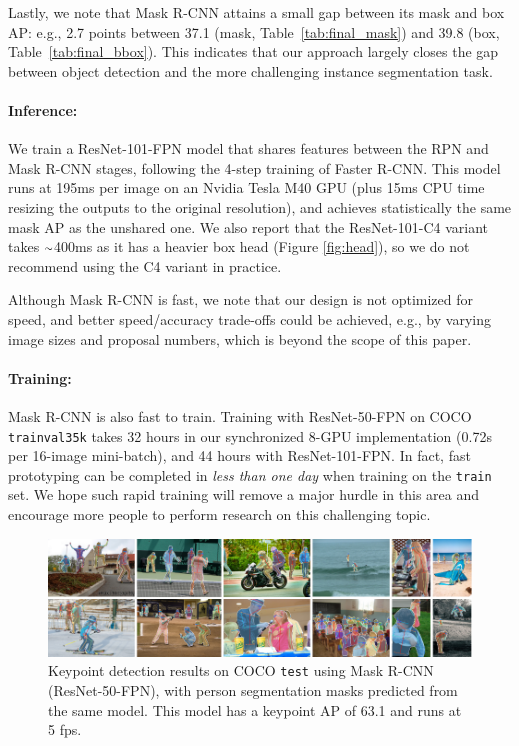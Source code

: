 Lastly, we note that Mask R-CNN attains a small gap between its mask and box AP: e.g., 2.7 points between 37.1 (mask, Table~\ref{tab:final_mask}) and 39.8 (box, Table~\ref{tab:final_bbox}). This indicates that our approach largely closes the gap between object detection and the more challenging instance segmentation task.


\paragraph{Inference:} We train a ResNet-101-FPN model that shares features between the RPN and Mask R-CNN stages, following the 4-step training of Faster R-CNN. This model runs at 195ms per image on an Nvidia Tesla M40 GPU (plus 15ms CPU time resizing the outputs to the original resolution), and achieves statistically the same mask AP as the unshared one. We also report that the ResNet-101-C4 variant takes $\app$400ms as it has a heavier box head (Figure \ref{fig:head}), so we do not recommend using the C4 variant in practice.

Although Mask R-CNN is fast, we note that our design is not optimized for speed, and better speed/accuracy trade-offs could be achieved, e.g., by varying image sizes and proposal numbers, which is beyond the scope of this paper.

\paragraph{Training:} Mask R-CNN is also fast to train. Training with ResNet-50-FPN on COCO \texttt{trainval35k} takes 32 hours in our synchronized 8-GPU implementation (0.72s per 16-image mini-batch), and 44 hours with ResNet-101-FPN. In fact, fast prototyping can be completed in \emph{less than one day} when training on the \texttt{train} set. We hope such rapid training will remove a major hurdle in this area and encourage more people to perform research on this challenging topic.

\begin{figure}[t]
\centering
\includegraphics[width=1.0\linewidth]{figures/mask_rcnn/results_keypoints}
\caption{Keypoint detection results on COCO \texttt{test} using Mask R-CNN (ResNet-50-FPN), with person segmentation masks predicted from the same model. This model has a keypoint AP of 63.1 and runs at 5 fps.}
\label{fig:results_keypoints}
\end{figure}

